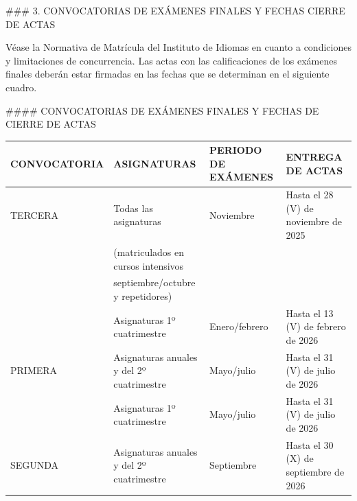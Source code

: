\documentclass{article}
\begin{document}
\begin{itemize}
\begin{itemize}
\begin{scriptsize}
                  \#\#\# 3. CONVOCATORIAS DE EXÁMENES FINALES Y FECHAS CIERRE DE ACTAS

                  Véase la Normativa de Matrícula del Instituto de Idiomas en cuanto a condiciones y limitaciones de concurrencia. Las actas con las calificaciones de los exámenes finales deberán estar firmadas en las fechas que se determinan en el siguiente cuadro.

                  \#\#\#\# CONVOCATORIAS DE EXÁMENES FINALES Y FECHAS DE CIERRE DE ACTAS

                  \vspace{0.4cm}
                  \begin{table}[h!]\centering\renewcommand{\arraystretch}{1.3}
                    \begin{tabular}{|p{}|p{}|p{}|p{}|}\hline
                      CONVOCATORIA & ASIGNATURAS                               & PERIODO DE EXÁMENES & ENTREGA DE ACTAS                      \\\hline
                      TERCERA      & Todas las asignaturas                     & Noviembre           & Hasta el 28 (V) de noviembre de 2025  \\\hline
                                   & (matriculados en cursos intensivos        &                     &                                       \\\hline
                                   & septiembre/octubre y repetidores)         &                     &                                       \\\hline
                                   & Asignaturas 1º cuatrimestre               & Enero/febrero       & Hasta el 13 (V) de febrero de 2026    \\\hline
                      PRIMERA      & Asignaturas anuales y del 2º cuatrimestre & Mayo/julio          & Hasta el 31 (V) de julio de 2026      \\\hline
                                   & Asignaturas 1º cuatrimestre               & Mayo/julio          & Hasta el 31 (V) de julio de 2026      \\\hline
                      SEGUNDA      & Asignaturas anuales y del 2º cuatrimestre & Septiembre          & Hasta el 30 (X) de septiembre de 2026 \\\hline
                    \end{tabular}\end{table}
                  \vspace{0.4cm}


\end{scriptsize}
\end{itemize}
\end{itemize}
\end{document}
